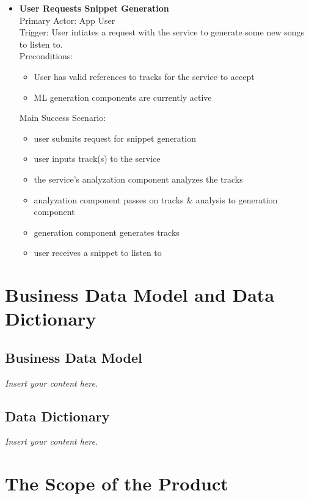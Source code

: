 \documentclass[12pt]{article}
\newcommand{\lips}{\textit{Insert your content here.}}
\begin{document}
\begin{itemize}
  \item \textbf{User Requests Snippet Generation}
    \\Primary Actor: App User
    \\Trigger: User intiates a request with the service to generate some new songs to listen to. 
    \\Preconditions: 
    \begin{itemize}
    \item User has valid references to tracks for the service to accept
    \item ML generation components are currently active
    \end{itemize}

    Main Success Scenario: 
    \begin{itemize}
    \item user submits request for snippet generation
    \item user inputs track(s) to the service
    \item the service's analyzation component analyzes the tracks
    \item analyzation component passes on tracks \& analysis to generation component
    \item generation component generates tracks
    \item user receives a snippet to listen to
    \end{itemize}
\end{itemize}



\section{Business Data Model and Data Dictionary}
\subsection{Business Data Model}
\lips
\subsection{Data Dictionary}
\lips

\section{The Scope of the Product}
\end{document}
